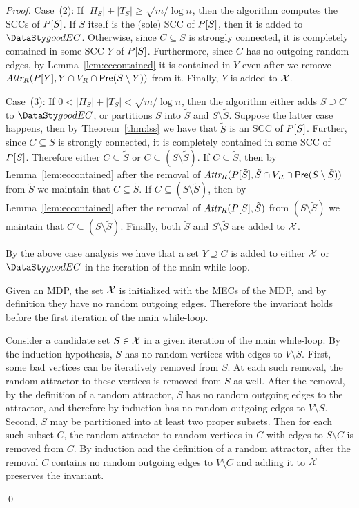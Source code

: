 \begin{proof}
\smallskip\noindent Case~(2): If $\lvert H_S \rvert + \lvert T_S \rvert \ge \sqrt{m / \log n}$,
then the algorithm computes the SCCs of $P[S]$. If $S$ itself is the (sole) SCC of $P[S]$, then it
is added to $\good$. Otherwise, since $C \subseteq S$ is strongly connected,
it is completely contained in some SCC $Y$ of $P[S]$. Furthermore, since $C$ has no outgoing
random edges, by Lemma~\ref{lem:eccontained} it is contained in $Y$ even after we remove
$\textit{Attr}_{R}(P[Y],  Y \cap V_R \cap \mathsf{Pre}(S \setminus Y) )$ from it. Finally, $Y$ is added to $\mathcal{X}$.

\smallskip\noindent Case~(3): If $0 < \lvert H_S \rvert + \lvert T_S \rvert < \sqrt{m / \log n}$,
then the algorithm either adds $S \supseteq C$ to $\good$, or partitions $S$
into $\tilde{S}$ and $S \setminus \tilde{S}$. Suppose the latter case happens, then by
Theorem~\ref{thm:lss} we have that $\tilde{S}$ is an SCC of $P[S]$. Further, since $C \subseteq S$
is strongly connected, it is completely contained in some SCC of $P[S]$.
Therefore either $C \subseteq \tilde{S}$ or $C \subseteq (S \setminus \tilde{S})$.
If $C \subseteq \tilde{S}$, then by Lemma~\ref{lem:eccontained} after the removal
of $\textit{Attr}_{R}(P[\tilde{S}],  \tilde{S} \cap V_R \cap \mathsf{Pre}(S \setminus \tilde{S}) )$ from
$\tilde{S}$ we maintain that $C \subseteq \tilde{S}$.
If $C \subseteq (S \setminus \tilde{S})$, then by Lemma~\ref{lem:eccontained} after the removal
of $\textit{Attr}_{R}(P[S],  \tilde{S} )$ from $(S \setminus \tilde{S})$ we maintain that $C \subseteq (S \setminus \tilde{S})$.
Finally, both $\tilde{S}$ and $S \setminus \tilde{S}$ are added to $\mathcal{X}$.

\smallskip\noindent By the above case analysis we have that a set $Y \supseteq C$ is added
to either $\mathcal{X}$ or $\good$ in the iteration of the main while-loop.

\smallskip{}
Given an MDP, the set $\mathcal{X}$ is initialized with the MECs of the MDP, and
by definition they have no random outgoing edges. Therefore the invariant holds
before the first iteration of the main while-loop.

Consider a candidate set $S \in \mathcal{X}$ in a given iteration of the main
while-loop. By the induction hypothesis, $S$ has no random vertices with edges to $V \setminus S$.
First, some bad vertices can be iteratively removed from $S$. At each such removal,
the random attractor to these vertices is removed from $S$ as well. After the removal,
by the definition of a random attractor, $S$ has no random outgoing edges to the attractor,
and therefore by induction has no random outgoing edges to $V \setminus S$.
Second, $S$ may be partitioned into at least two proper subsets. Then for each
such subset $C$, the random attractor to random vertices in $C$ with edges
to $S \setminus C$ is removed from $C$. By induction and the definition of a random attractor,
after the removal $C$ contains no random outgoing edges to $V \setminus C$ and 
adding it to $\mathcal{X}$ preserves the invariant.

\qed
\end{proof}

